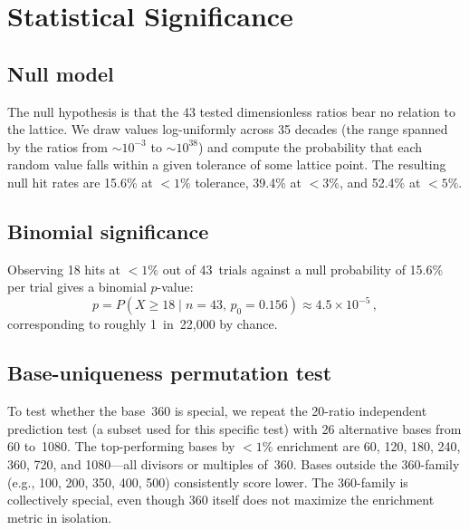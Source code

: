 \documentclass[12pt,a4paper]{article}
\begin{document}
\section{Statistical Significance}
\label{sec:stats}

\subsection{Null model}
\label{sec:null}

The null hypothesis is that the 43 tested dimensionless ratios bear no
relation to the lattice.  We draw values log-uniformly across 35 decades
(the range spanned by the ratios from $\sim\!10^{-3}$ to $\sim\!10^{38}$)
and compute the probability that each random value falls within a given
tolerance of some lattice point.  The resulting null hit rates are 15.6\%
at $<\!1\%$ tolerance, 39.4\% at $<\!3\%$, and 52.4\% at $<\!5\%$.

\subsection{Binomial significance}
\label{sec:binomial}

Observing 18 hits at $<\!1\%$ out of 43~trials against a null probability of
15.6\% per trial gives a binomial $p$-value:
\begin{equation}
  p = P(X \ge 18 \mid n = 43,\, p_0 = 0.156) \approx 4.5 \times 10^{-5}\,,
\end{equation}
corresponding to roughly 1~in~22{,}000 by chance.

\subsection{Base-uniqueness permutation test}
\label{sec:base_test}

To test whether the base~360 is special, we repeat the 20-ratio independent
prediction test (a subset used for this specific test) with 26 alternative
bases from 60 to~1080.  The top-performing bases by $<\!1\%$ enrichment are
60, 120, 180, 240, 360, 720, and 1080---all divisors or multiples of~360.
Bases outside the 360-family (e.g., 100, 200, 350, 400, 500) consistently
score lower.  The 360-family is collectively special, even though 360 itself
does not maximize the enrichment metric in isolation.
\end{document}

